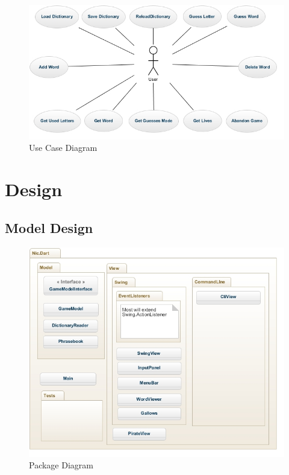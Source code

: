 \documentclass[a4paper, 11pt]{article}
\begin{document}
\begin{figure}[H]
\centering
\includegraphics[scale=0.6]{./res/UsecaseDiagram.jpg}
\caption{Use Case Diagram}
\label{UseCaseDiagram}
\end{figure}


\newpage

\section{Design}

\subsection{Model Design}

\begin{figure}[H]
\centering
\includegraphics[scale=0.7]{./res/PackageDiagram.jpg}
\caption{Package Diagram}
\label{PackageDiagram}
\end{figure}
\end{document}
